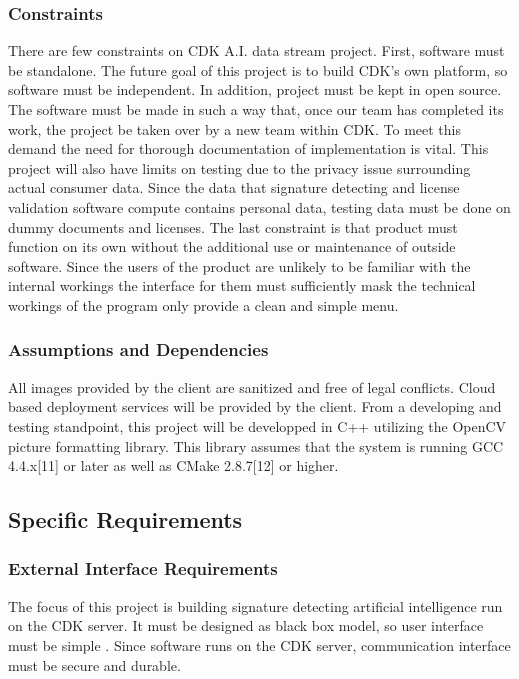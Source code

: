 \documentclass[article, onecolumn, draftclsnofoot,10pt, compsoc]{IEEEtran}
\begin{document}
\subsubsection{Constraints}
There are few constraints on CDK A.I. data stream project. First, software must be standalone. The future goal of this project is to build CDK’s own platform, so software must be independent. In addition, project must be kept in open source. The software must be made in such a way that, once our team has completed its work, the project be taken over by a new team within CDK. To meet this demand the need for thorough documentation of implementation is vital. This project will also have limits on testing due to the privacy issue surrounding actual consumer data. Since the data that signature detecting and license validation software compute contains personal data, testing data must be done on dummy documents and licenses. The last constraint is that product must function on its own without the additional use or maintenance of outside software. Since the users of the product are unlikely to be familiar with the internal workings the interface for them must sufficiently mask the technical workings of the program only provide a clean and simple menu.

\subsubsection{Assumptions and Dependencies}

All images provided by the client are sanitized and free of legal conflicts. Cloud based deployment services will be provided by the client. From a developing and testing standpoint, this project will be developped in C++ utilizing the OpenCV picture formatting library. This library assumes that the system is running GCC 4.4.x[11] or later as well as CMake 2.8.7[12] or higher. 



\subsection{Specific Requirements}

\subsubsection{External Interface Requirements}
The focus of this project is building signature detecting artificial intelligence run on the CDK server. It must be designed as black box model, so user interface must be simple . Since software runs on the CDK server, communication interface must be secure and durable. 
\end{document}
